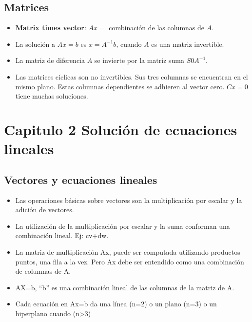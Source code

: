 \documentclass[]{article}
\begin{document}
\subsection{Matrices}

\begin{itemize}
	
	\item \textbf{Matrix times vector}: $ Ax = $ combinaci\'on de las columnas de $ A $.  
	
	\item La soluci\'on a $ Ax=b $ es $ x=A^{-1}b $, cuando $ A $ es una matriz invertible. 
	
	\item La matriz de diferencia $ A $ se invierte por la matriz suma $ S0A^{-1} $. 
	
	\item Las matrices c\'iclicas son no invertibles. Sus tres columnas se encuentran en el mismo plano. Estas columnas dependientes se adhieren al vector cero. $ Cx=0 $ tiene muchas soluciones.  
	
\end{itemize}

\section{Capitulo 2 Solución de ecuaciones lineales}

\subsection{Vectores y ecuaciones lineales}

\begin{itemize}
	\item Las operaciones básicas sobre vectores son la multiplicación por escalar y la adición de vectores.
	\item La utilización de la multiplicación por escalar y la suma conforman una combinación lineal. Ej: cv+dw.
	\item La matriz de multiplicación Ax, puede ser computada utilizando productos puntos, una fila a la vez. Pero Ax debe ser entendido como una combinación de columnas de A.
	\item AX=b, ``b'' es una combinación lineal de las columnas de la matriz de A.
	\item Cada ecuación en Ax=b da una línea (n=2) o un plano (n=3) o un hiperplano cuando (n>3)
\end{itemize}
\end{document}
